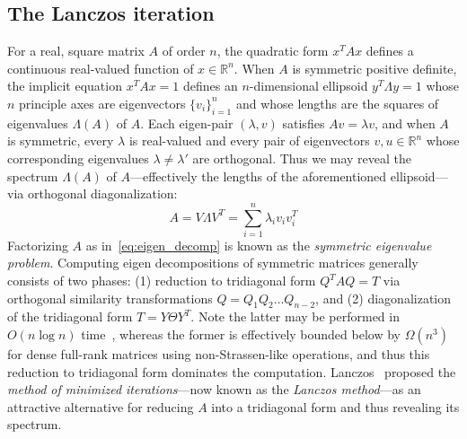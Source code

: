 \documentclass[10pt]{article}
\numberwithin{equation}{section}
\newcommand{\+}{%
	\raisebox{0.18ex}{\scaleobj{0.55}{+}}
}
\theoremstyle{definition}
\begin{document}
\subsection{The Lanczos iteration}
For a real, square matrix $A$ of order $n$, the quadratic form $x^T A x$ defines a continuous real-valued function of $x \in \mathbb{R}^n$. When $A$ is symmetric positive definite, the implicit equation $x^T A x = 1$ defines an $n$-dimensional ellipsoid $y^T \Lambda y = 1$ whose $n$ principle axes are eigenvectors $\{v_i\}_{i=1}^n$ and whose lengths are the squares of eigenvalues $\Lambda(A)$ of $A$.
Each eigen-pair $(\lambda, v)$ satisfies $A v = \lambda v$, and when $A$ is symmetric, every $\lambda$ is real-valued and every pair of eigenvectors $v, u \in \mathbb{R}^n$ whose corresponding eigenvalues $\lambda \neq \lambda'$ are orthogonal.  
Thus we may reveal the spectrum $\Lambda(A)$ of $A$---effectively the lengths of the aforementioned ellipsoid---via orthogonal diagonalization:
\begin{equation}\label{eq:eigen_decomp}
	A = V \Lambda V^T = \sum\limits_{i=1}^n \lambda_i v_i v_i^T
\end{equation}
Factorizing $A$ as in~\eqref{eq:eigen_decomp} is known as the \emph{symmetric eigenvalue problem}. 
Computing eigen decompositions of symmetric matrices generally consists of two phases: (1) reduction to tridiagonal form $Q^T A Q = T$ via orthogonal similarity transformations $Q = Q_1 Q_2 \dots Q_{n-2}$, and (2) diagonalization of the tridiagonal form $T = Y \Theta Y^T$. 
Note the latter may be performed in $O(n \log n)$ time~\cite{gu1995divide}, whereas the former is effectively bounded below by $\Omega(n^3)$ for dense full-rank matrices using non-Strassen-like operations, and thus this reduction to tridiagonal form dominates the computation. 
Lanczos~\cite{lanczos1950iteration} proposed the \emph{method of minimized iterations}---now known as the \emph{Lanczos method}---as an attractive alternative for reducing $A$ into a tridiagonal form and thus revealing its spectrum.
\end{document}
